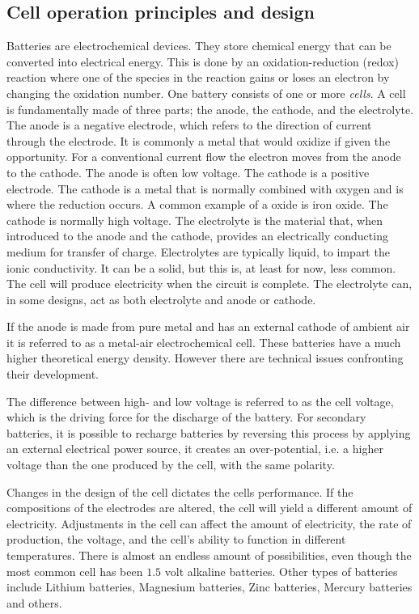 \subsection{Cell operation principles and design}
Batteries are electrochemical devices. They store chemical energy that can be converted into electrical energy. This is done by an oxidation-reduction (redox) reaction where one of the species in the reaction gains or loses an electron by changing the oxidation number.  One battery consists of one or more \textit{cells}. A cell is fundamentally made of three parts; the anode, the cathode, and the electrolyte.
The anode is a negative electrode, which refers to the direction of current through the electrode. It is commonly a metal that would oxidize if given the opportunity. For a conventional current flow the electron moves from the anode to the cathode. The anode is often low voltage.  
The cathode is a positive electrode. The cathode is a metal that is normally combined with oxygen and is where the reduction occurs. A common example of a oxide is iron oxide. The cathode is normally high voltage. 
The electrolyte is the material that, when introduced to the anode and the cathode, provides an electrically conducting medium for transfer of charge. Electrolytes are typically liquid, to impart the ionic conductivity. It can be a solid, but this is, at least for now, less common. The cell will produce electricity when the circuit is complete. The electrolyte can, in some designs, act as both electrolyte and anode or cathode. 

If the anode is made from pure metal and has an external cathode of ambient air it is referred to as a metal-air electrochemical cell. These batteries have a much higher theoretical energy density. However there are technical issues confronting their development. \cite{li2017metal} 

The difference between high- and low voltage is referred to as the cell voltage, which is the driving force for the discharge of the battery. For secondary batteries, it is possible to recharge batteries by reversing this process by applying an external electrical power source, it creates an over-potential, i.e. a higher voltage than the one produced by the cell, with the same polarity. 

Changes in the design of the cell dictates the cells performance. If the compositions of the electrodes are altered, the cell will yield a different amount of electricity. Adjustments in the cell can affect the amount of electricity, the rate of production, the voltage, and the cell's ability to function in different temperatures. There is almost an endless amount of possibilities, even though the most common cell has been $1.5$ volt alkaline batteries. Other types of batteries include Lithium  batteries, Magnesium batteries, Zinc batteries,  Mercury batteries and others.

